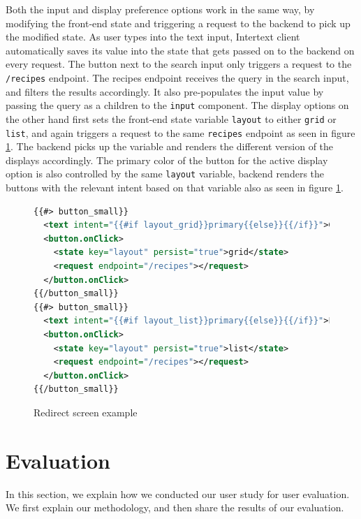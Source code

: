 Both the input and display preference options work in the same way, by modifying the front-end state and triggering a request to the backend to pick up the modified state. As user types into the text input, Intertext client automatically saves its value into the state that gets passed on to the backend on every request. The  button next to the search input only triggers a request to the \texttt{/recipes} endpoint. The recipes endpoint receives the query in the search input, and filters the results accordingly. It also pre-populates the input value by passing the query as a children to the \texttt{input} component. The display options on the other hand first sets the front-end state variable \texttt{layout} to either \texttt{grid} or \texttt{list}, and again triggers a request to the same \texttt{recipes} endpoint as seen in figure \ref{fig:rec_display_options}. The backend picks up the variable and renders the different version of the displays accordingly. The primary color of the button for the active display option is also controlled by the same \texttt{layout} variable, backend renders the buttons with the relevant intent based on that variable also as seen in figure \ref{fig:rec_display_options}.

\begin{figure}[htb]
\begin{minipage}{\linewidth}
\begin{lstlisting}[language=xml]
{{#> button_small}}
  <text intent="{{#if layout_grid}}primary{{else}}{{/if}}">Grid</text>
  <button.onClick>
    <state key="layout" persist="true">grid</state>
    <request endpoint="/recipes"></request>
  </button.onClick>
{{/button_small}}
{{#> button_small}}
  <text intent="{{#if layout_list}}primary{{else}}{{/if}}">List</text>
  <button.onClick>
    <state key="layout" persist="true">list</state>
    <request endpoint="/recipes"></request>
  </button.onClick>
{{/button_small}}
\end{lstlisting}
\end{minipage}
\caption{Redirect screen example}%
\label{fig:rec_display_options}%
\end{figure}


\section{Evaluation}

In this section, we explain how we conducted our user study for user evaluation. We first explain our methodology, and then share the results of our evaluation.


